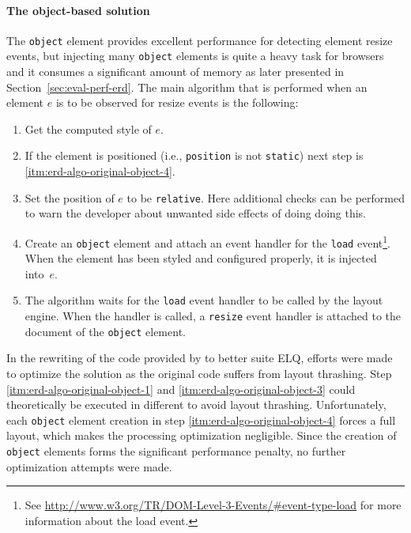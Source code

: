 \documentclass[a4paper,11pt]{kth-mag}
\newcommand{\code}[1]{\texttt{#1}}
\begin{document}
        \paragraph{The object-based solution}
        The \code{object} \gls{element} provides excellent performance for detecting \gls{element} resize events, but injecting many \code{object} \glspl{element} is quite a heavy task for \glspl{browser} and it consumes a significant amount of memory as later presented in Section~\ref{sec:eval-perf-erd}.
        The main algorithm that is performed when an element $e$ is to be observed for resize events is the following:
        \begin{enumerate}
          \item\label{itm:erd-algo-original-object-1} Get the computed style of $e$.
          \item                                       If the element is positioned (i.e., \code{position} is not \code{static}) next step is \ref{itm:erd-algo-original-object-4}.
          \item\label{itm:erd-algo-original-object-3} Set the position of $e$ to be \code{relative}. Here additional checks can be performed to warn the developer about unwanted side effects of doing doing this.
          \item\label{itm:erd-algo-original-object-4} Create an \code{object} element and attach an event handler for the \code{load} event\footnote{See \url{http://www.w3.org/TR/DOM-Level-3-Events/\#event-type-load} for more information about the load event.}. When the element has been styled and configured properly, it is injected into~$e$.
          \item                                       The algorithm waits for the \code{load} event handler to be called by the \gls{layout engine}. When the handler is called, a \code{resize} event handler is attached to the \gls{document} of the \code{object} \gls{element}.
        \end{enumerate}
        In the rewriting of the code provided by \cite{backalley} to better suite \gls{ELQ}, efforts were made to optimize the solution as the original code suffers from \gls{layout thrashing}.
        Step \ref{itm:erd-algo-original-object-1} and \ref{itm:erd-algo-original-object-3} could theoretically be executed in different  to avoid \gls{layout thrashing}.
        Unfortunately, each \code{object} element creation in step \ref{itm:erd-algo-original-object-4} forces a full layout, which makes the  processing optimization negligible.
        Since the creation of \code{object} \glspl{element} forms the significant performance penalty, no further optimization attempts were made.
\end{document}
